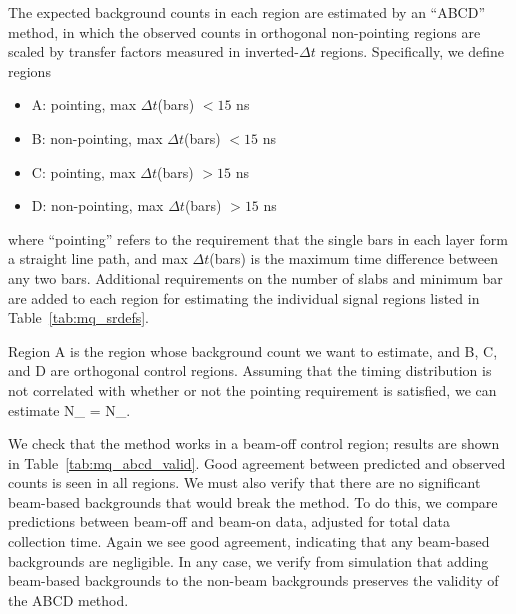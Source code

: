 {The expected background counts in each region are estimated by an ``ABCD'' method, in which the
observed counts in orthogonal non-pointing regions are scaled by transfer factors measured
in inverted-$\Delta t$ regions. Specifically, we define regions
\begin{itemize}\setlength\itemsep{-1mm}
\item A: pointing, max $\Delta t$(bars) $<15$ ns
\item B: non-pointing, max $\Delta t$(bars) $<15$ ns
\item C: pointing, max $\Delta t$(bars) $>15$ ns
\item D: non-pointing, max $\Delta t$(bars) $>15$ ns
\end{itemize}
where ``pointing'' refers to the requirement that the single bars in each layer form a straight line path,
and max $\Delta t$(bars) is the maximum time difference between any two bars. Additional requirements
on the number of slabs and minimum bar \Npe are added to each region for estimating the individual signal
regions listed in Table~\ref{tab:mq_srdefs}.

Region A is the region whose background count we want to estimate, and B, C, and D are orthogonal control regions. 
Assuming that the timing distribution is not correlated with whether or not the pointing requirement is satisfied, 
we can estimate
\be
N_ =  N_.
\ee

We check that the method works in a beam-off control region; results are shown in
Table~\ref{tab:mq_abcd_valid}. Good agreement between predicted and observed counts
is seen in all regions. We must also verify that there are no significant beam-based
backgrounds that would break the method. To do this, we compare predictions between
beam-off and beam-on data, adjusted for total data collection time. Again we see
good agreement, indicating that any beam-based backgrounds are negligible.
In any case, we verify from simulation that adding beam-based backgrounds
to the non-beam backgrounds preserves the validity of the ABCD method.

}
